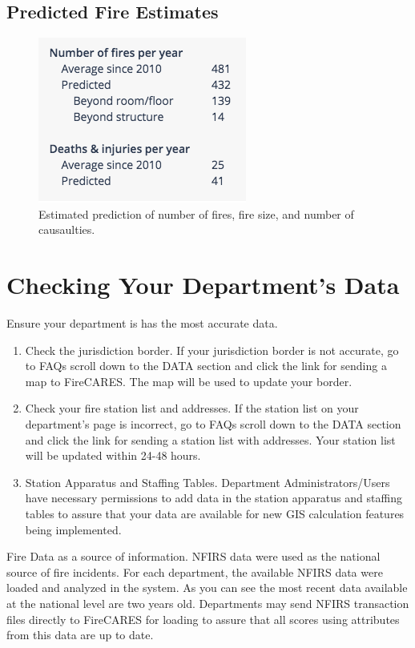 \documentclass[12pt,oneside]{book}
\begin{document}
\section{Predicted Fire Estimates}

\begin{figure}[ht!]
\centering
\includegraphics[width=.5\columnwidth]{Figures/fire_predictions}
\caption{Estimated prediction of number of fires, fire size, and number of causaulties.}
\label{fig:fire_predictions}
\end{figure}

\chapter{Checking Your Department's Data}

Ensure your department is has the most accurate data.

\begin{enumerate}
\item Check the jurisdiction border. If your jurisdiction border is not accurate, go to FAQs scroll down to the DATA section and click the link for sending a map to FireCARES.  The map will be used to update your border.

\item Check your fire station list and addresses. If the station list on your department's page is incorrect, go to FAQs scroll down to the DATA section and click the link for sending a station list with addresses.  Your station list will be updated within 24-48 hours.

\item Station Apparatus and Staffing Tables. Department Administrators/Users have necessary permissions to add data in the station apparatus and staffing tables to assure that your data are available for new GIS calculation features being implemented. 
\end{enumerate}

Fire Data as a source of information. NFIRS data were used as the national source of fire incidents. For each department, the available NFIRS data were loaded and analyzed in the system.  As you can see the most recent data available at the national level are two years old. Departments may send NFIRS transaction files directly to FireCARES for loading to assure that all scores using attributes from this data are up to date.  
\end{document}
